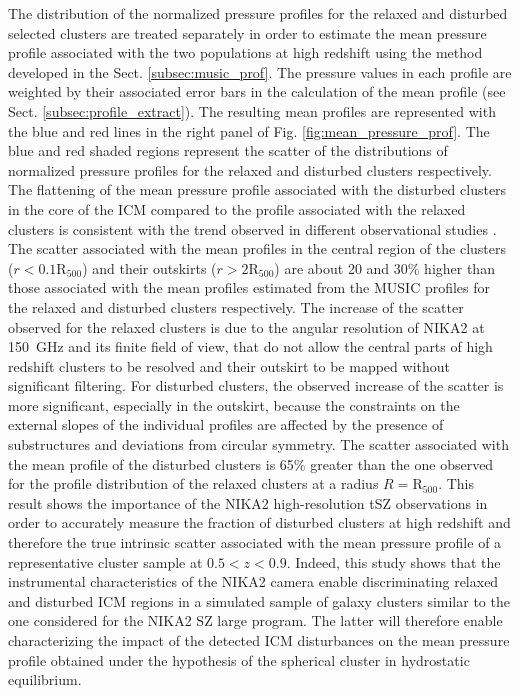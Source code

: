 \documentclass[twocolumn,traditabstract]{aa}
\begin{document}
The distribution of the normalized pressure profiles for the relaxed and disturbed selected clusters are treated separately in order to estimate the mean pressure profile associated with the two populations at high redshift using the method developed in the Sect. \ref{subsec:music_prof}. The pressure values in each profile are weighted by their associated error bars in the calculation of the mean profile (see Sect. \ref{subsec:profile_extract}). The resulting mean profiles are represented with the blue and red lines in the right panel of Fig. \ref{fig:mean_pressure_prof}. The blue and red shaded regions represent the scatter of the distributions of normalized pressure profiles for the relaxed and disturbed clusters respectively. The flattening of the mean pressure profile associated with the disturbed clusters in the core of the ICM compared to the profile associated with the relaxed clusters is consistent with the trend observed in different observational studies \citep[\emph{e.g.}][]{arn10}. The scatter associated with the mean profiles in the central region of the clusters ($r < 0.1\mathrm{R_{500}}$) and their outskirts ($r > 2\mathrm{R_{500}}$) are about 20 and 30\% higher than those associated with the mean profiles estimated from the MUSIC profiles for the relaxed and disturbed clusters respectively. The increase of the scatter observed for the relaxed clusters is due to the angular resolution of NIKA2 at 150~GHz and its finite field of view, that do not allow the central parts of high redshift clusters to be resolved and their outskirt to be mapped without significant filtering. For disturbed clusters, the observed increase of the scatter is more significant, especially in the outskirt, because the constraints on the external slopes of the individual profiles are affected by the presence of substructures and deviations from circular symmetry. The scatter associated with the mean profile of the disturbed clusters is 65\% greater than the one observed for the profile distribution of the relaxed clusters at a radius $R = \mathrm{R_{500}}$. This result shows the importance of the NIKA2 high-resolution tSZ observations in order to accurately measure the fraction of disturbed clusters at high redshift and therefore the true intrinsic scatter associated with the mean pressure profile of a representative cluster sample at $0.5 < z < 0.9$. Indeed, this study shows that the instrumental characteristics of the NIKA2 camera enable discriminating relaxed and disturbed ICM regions in a simulated sample of galaxy clusters similar to the one considered for the NIKA2 SZ large program. The latter will therefore enable characterizing the impact of the detected ICM disturbances on the mean pressure profile obtained under the hypothesis of the spherical cluster in hydrostatic equilibrium.
\end{document}
